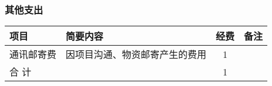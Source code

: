 \subsubsection{其他支出}
\begin{table}[H]
	\centering
	\begin{tabular}{m{3cm} m{7.5cm} cc}
		\toprule
		项目       & 简要内容                       & 经费 & 备注 \\
		\midrule
		通讯邮寄费 & 因项目沟通、物资邮寄产生的费用 & 1    &      \\
		合 计      &                                & 1           \\
		\bottomrule
	\end{tabular}
\end{table}





